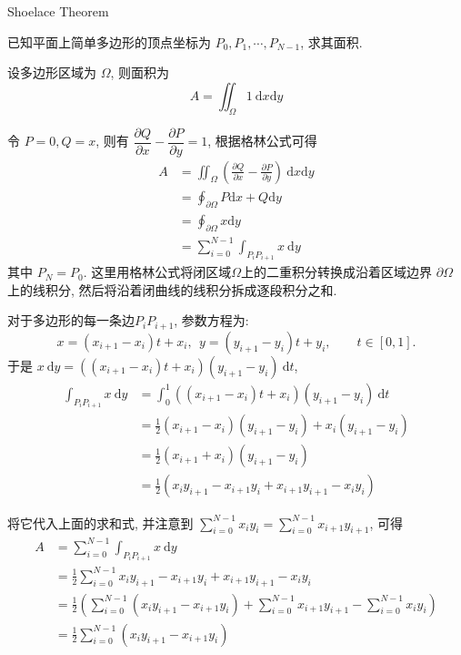 \newpage
\noindent Shoelace Theorem

已知平面上简单多边形的顶点坐标为 $P_0, P_1, \cdots, P_{N-1}$, 求其面积.

设多边形区域为 $\Omega$, 则面积为
\[
A = \iint_\Omega {1}\ \mathrm{d}x\mathrm{d}y
\]

令 $P = 0, Q = x$, 则有 $\dfrac{\partial Q}{\partial x} - \dfrac{\partial P}{\partial y} = 1$, 根据格林公式可得
\begin{align*}
A &= \iint_\Omega {\left( \frac{\partial Q}{\partial x} - \frac{\partial P}{\partial y} \right)}\ \mathrm{d}x\mathrm{d}y \\
&= \oint_{\partial\Omega} P\mathrm{d}x + Q\mathrm{d}y\\
&= \oint_{\partial\Omega} x\mathrm{d}y \\
&= \sum_{i=0}^{N-1} \int_{P_iP_{i+1}} x\ \mathrm{d}y
\end{align*}
其中 $P_N = P_0$. 
这里用格林公式将闭区域$\Omega$上的二重积分转换成沿着区域边界 $\partial\Omega$ 上的线积分, 然后将沿着闭曲线的线积分拆成逐段积分之和.

对于多边形的每一条边$P_{i}P_{i+1}$, 参数方程为:
\[
x = (x_{i+1}-x_i)t + x_i, \ \ y = (y_{i+1}-y_i)t + y_i, \qquad t\in[0,1].
\]
于是 $x\ \mathrm{d}y = ((x_{i+1}-x_i)t+x_i)(y_{i+1}-y_i)\ \mathrm{d}t$, 
\begin{align*}
\int_{P_iP_{i+1}} x\ \mathrm{d}y &= \int_0^1 ((x_{i+1}-x_i)t+x_i)(y_{i+1}-y_i)\ \mathrm{d}t\\
&= \frac{1}{2}(x_{i+1}-x_i)(y_{i+1}-y_i) + x_i(y_{i+1}-y_i) \\
&= \frac{1}{2}(x_{i+1}+x_i)(y_{i+1}-y_i) \\
&= \frac{1}{2}(x_i y_{i+1}-x_{i+1} y_i + x_{i+1}y_{i+1}-x_i y_i)
\end{align*}

将它代入上面的求和式, 并注意到 $\displaystyle \sum_{i=0}^{N-1}x_iy_i = \sum_{i=0}^{N-1}x_{i+1}y_{i+1} $, 可得
\begin{align*}
A &= \sum_{i=0}^{N-1} \int_{P_iP_{i+1}} x\ \mathrm{d}y \\
&= \frac{1}{2}\sum_{i=0}^{N-1}{x_i y_{i+1}-x_{i+1} y_i + x_{i+1}y_{i+1}-x_i y_i}\\
&= \frac{1}{2}\left(\sum_{i=0}^{N-1} (x_i y_{i+1}-x_{i+1} y_i) + \sum_{i=0}^{N-1} x_{i+1}y_{i+1} - \sum_{i=0}^{N-1} x_i y_i\right)\\
&= \frac{1}{2}\sum_{i=0}^{N-1} (x_i y_{i+1}-x_{i+1} y_i)
\end{align*}



